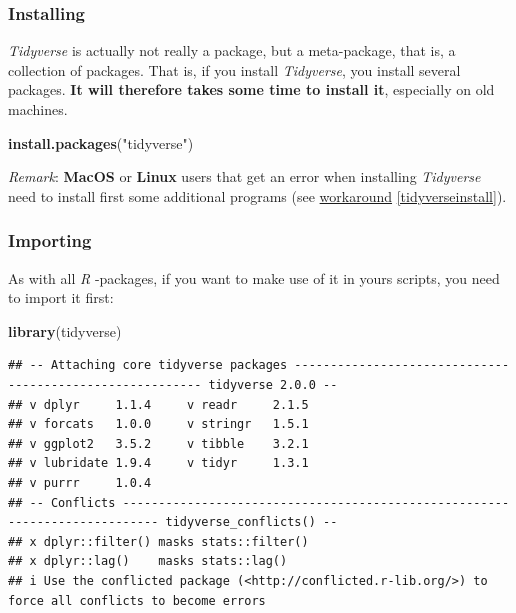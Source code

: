 \documentclass[
]{scrartcl}
\newenvironment{Shaded}{\begin{snugshade}}{\end{snugshade}}
\newcommand{\FunctionTok}[1]{\textcolor[rgb]{0.13,0.29,0.53}{\textbf{#1}}}
\newcommand{\NormalTok}[1]{#1}
\newcommand{\StringTok}[1]{\textcolor[rgb]{0.31,0.60,0.02}{#1}}
\begin{document}
\subsubsection*{Installing}\label{installing}

\emph{Tidyverse} is actually not really a package, but a meta-package, that is, a collection of packages. That is, if you install \emph{Tidyverse}, you install several packages. \textbf{It will therefore takes some time to install it}, especially on old machines.

\begin{Shaded}
\begin{Highlighting}[]
\FunctionTok{install.packages}\NormalTok{(}\StringTok{"tidyverse"}\NormalTok{)}
\end{Highlighting}
\end{Shaded}

\emph{Remark}: \textbf{MacOS} or \textbf{Linux} users that get an error when installing \emph{Tidyverse} need to install first some additional programs (see \hyperref[tidyverseinstall]{workaround} \ref{tidyverseinstall}).

\subsubsection*{Importing}\label{importing}

As with all \emph{R} -packages, if you want to make use of it in yours scripts, you need to import it first:

\begin{Shaded}
\begin{Highlighting}[]
\FunctionTok{library}\NormalTok{(tidyverse)}
\end{Highlighting}
\end{Shaded}

\begin{verbatim}
## -- Attaching core tidyverse packages --------------------------------------------------------- tidyverse 2.0.0 --
## v dplyr     1.1.4     v readr     2.1.5
## v forcats   1.0.0     v stringr   1.5.1
## v ggplot2   3.5.2     v tibble    3.2.1
## v lubridate 1.9.4     v tidyr     1.3.1
## v purrr     1.0.4     
## -- Conflicts --------------------------------------------------------------------------- tidyverse_conflicts() --
## x dplyr::filter() masks stats::filter()
## x dplyr::lag()    masks stats::lag()
## i Use the conflicted package (<http://conflicted.r-lib.org/>) to force all conflicts to become errors
\end{verbatim}
\end{document}

